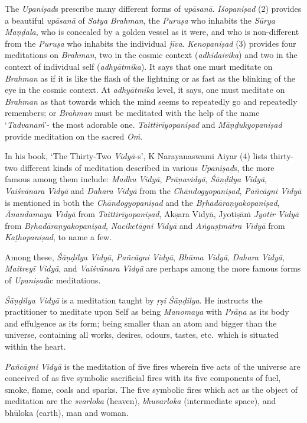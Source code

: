 The \emph{Upaniṣad}s prescribe many different forms of \emph{upāsanā}. \emph{Īśopaniṣad} (2) provides a beautiful \emph{upāsanā} of \emph{Satya} \emph{Brahman}, the \emph{Puruṣa} who inhabits the \emph{Sūrya} \emph{Maṇḍala}, who is concealed by a golden vessel as it were, and who is non-different from the \emph{Puruṣa} who inhabits the individual \emph{jīva}. \emph{Kenopaniṣad} (3) provides four meditations on \emph{Brahman}, two in the cosmic context (\emph{adhidaivika}) and two in the context of individual self (\emph{adhyātmika}). It says that one must meditate on \emph{Brahman} as if it is like the flash of the lightning or as fast as the blinking of the eye in the cosmic context. At \emph{adhyātmika} level, it says, one must meditate on \emph{Brahman} as that towards which the mind seems to repeatedly go and repeatedly remembers; or \emph{Brahman} must be meditated with the help of the name `\emph{Tadvanaṁ}'- the most adorable one. \emph{Taittirīyopaniṣad} and \emph{Māṇḍukyopaniṣad} provide meditation on the sacred \emph{Oṁ}.

In his book, `The Thirty-Two \emph{Vidyā}-s', K Narayanaswami Aiyar (4) lists thirty-two different kinds of meditation described in various \emph{Upaniṣad}s, the more famous among them include: \emph{Madhu} \emph{Vidyā}, \emph{Prāṇavidyā}, \emph{Śāṇḍilya} \emph{Vidyā}, \emph{Vaiśvānara} \emph{Vidyā} and \emph{Dahara} \emph{Vidyā} from the \emph{Chāndogyopaniṣad}, \emph{Pañcāgni Vidyā} is mentioned in both the \emph{Chāndogyopaniṣad} and the \emph{Bṛhadāraṇyakopaniṣad}, \emph{Ānandamaya Vidyā} from \emph{Taittirīyopaniṣad}, Akṣara Vidyā, Jyotiṣāṁ \emph{Jyotir Vidyā} from \emph{Bṛhadāraṇyakopaniṣad}, \emph{Naciketāgni} \emph{Vidyā} and \emph{Aṅguṣṭmātra Vidyā} from \emph{Kaṭhopaniṣad}, to name a few.

Among these, \emph{Śāṇḍilya} \emph{Vidyā}, \emph{Pañcāgni Vidyā}, \emph{Bhūma Vidyā}, \emph{Dahara} \emph{Vidyā}, \emph{Maitreyī} \emph{Vidyā}, and \emph{Vaiśvānara} \emph{Vidyā} are perhaps among the more famous forms of \emph{Upaniṣad}ic meditations.

\emph{Śāṇḍilya} \emph{Vidyā} is a meditation taught by \emph{ṛṣi} \emph{Śāṇḍilya}. He instructs the practitioner to meditate upon Self as being \emph{Manomaya} with \emph{Prāṇa} as its body and effulgence as its form; being smaller than an atom and bigger than the universe, containing all works, desires, odours, tastes, etc.\ which is situated within the heart.

\emph{Pañcāgni} \emph{Vidyā} is the meditation of five fires wherein five acts of the universe are conceived of as five symbolic sacrificial fires with its five components of fuel, smoke, flame, coals and sparks. The five symbolic fires which act as the object of meditation are the \emph{svarloka} (heaven), \emph{bhuvarloka} (intermediate space), and bhūloka (earth), man and woman.


